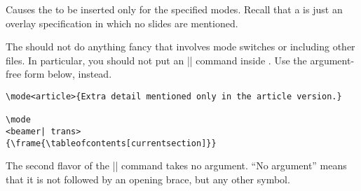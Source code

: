 \begin{command}{\mode{}}
  Causes the  to be inserted only for the specified modes. Recall that a  is just an overlay specification in which no slides are mentioned.

  The  should not do anything fancy that involves mode switches or including other files. In particular, you should not put an || command inside . Use the argument-free form below, instead.

  \example
\begin{verbatim}
\mode<article>{Extra detail mentioned only in the article version.}

\mode
<beamer| trans>
{\frame{\tableofcontents[currentsection]}}
\end{verbatim}
\end{command}

The second flavor of the |\mode| command takes no argument. ``No argument'' means that it is not followed by an opening brace, but any other symbol.

